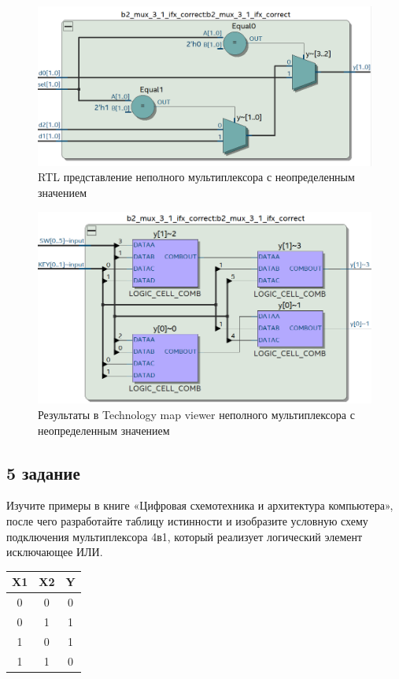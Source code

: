 \documentclass[a4paper,14pt]{article}
\begin{document}

\begin{figure}[H]
	\centering
	\includegraphics[width=0.6\linewidth]{img/z4_rtl_ifx_correct}
	\caption{RTL представление неполного мультиплексора с неопределенным значением}
	\label{fig:z4_rtl_ifx_correct}
\end{figure}

\begin{figure}[H]
	\centering
	\includegraphics[width=0.6\linewidth]{img/z4_tmv_ifx_correct}
	\caption{Результаты в Technology map viewer неполного мультиплексора с неопределенным значением}
	\label{fig:z4_tmv_ifx_correct}
\end{figure}

\subsection{5 задание}

Изучите примеры в книге «Цифровая схемотехника и архитектура компьютера», после чего	разработайте таблицу истинности и изобразите условную схему подключения мультиплексора 4в1, который реализует логический элемент исключающее ИЛИ. 

\begin{table}[H]
	\begin{center}
		\begin{flushleft}
		\end{flushleft}
		\label{tab:iskl_ili}
		\begin{tabular}{|c|c|c|}
			\hline
			X1 & X2 & Y \\ \hline
			0  & 0  & 0 \\ \hline
			0  & 1  & 1 \\ \hline
			1  & 0  & 1 \\ \hline
			1  & 1  & 0 \\ \hline
		\end{tabular}
	\end{center}
\end{table}
\end{document}
